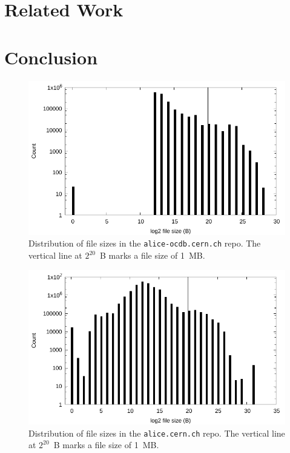 \documentclass[sigconf]{acmart}
\begin{document}
\section{Related Work}

\section{Conclusion}

\begin{figure}
\includegraphics[width=\linewidth]{plots/file-hist/alice-ocdb.pdf}
\caption{Distribution of file sizes in the \texttt{alice-ocdb.cern.ch} repo.
The vertical line at $2^{20}$~B marks a file size of 1~MB.}
\end{figure}

\begin{figure}
\includegraphics[width=\linewidth]{plots/file-hist/alice.pdf}
\caption{Distribution of file sizes in the \texttt{alice.cern.ch} repo.
The vertical line at $2^{20}$~B marks a file size of 1~MB.}
\end{figure}
\end{document}
